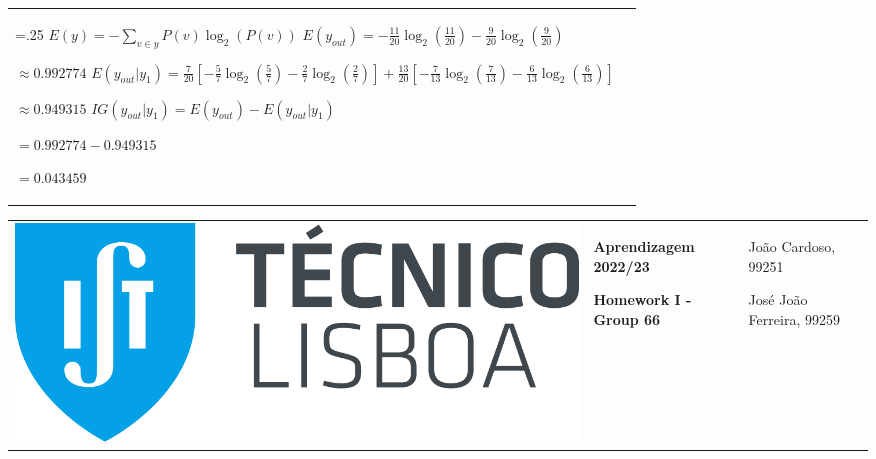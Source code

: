 \documentclass[11pt,a4paper]{article}
\begin{document}
\begin{flushleft}
\begin{tabularx}{1.09\textwidth}{>{\hsize=.25\hsize}X X}
  \normalsize\vspace{5mm}
  $ E(y) = -\sum_{v \in y} P(v)\log_2(P(v)) $
  \newline\newline
  $ E(y_{out}) = -\frac{11}{20}\log_2(\frac{11}{20}) -\frac{9}{20}\log_2(\frac{9}{20}) $ \par\vspace{1mm}
  \hspace{12.25mm} $ \approx 0.992774 $
  \newline\newline
  $ E(y_{out}|y_1) = \frac{7}{20}[-\frac{5}{7}\log_2(\frac{5}{7}) -\frac{2}{7}\log_2(\frac{2}{7})] + \frac{13}{20}[-\frac{7}{13}\log_2(\frac{7}{13}) -\frac{6}{13}\log_2(\frac{6}{13})] $ \par\vspace{1mm}
  \hspace{16.75mm} $ \approx 0.949315 $ 
  \newline\newline
  $ IG(y_{out}|y_1) = E(y_{out}) - E(y_{out}|y_1) $ \par\vspace{1mm}
  \hspace{18.75mm} $ = 0.992774 - 0.949315 $ \par\vspace{1mm}
  \hspace{18.75mm} $ = 0.043459 $
  
\end{tabularx}
\end{flushleft}

\pagebreak

\color{darkgray}
\hspace{-8.25mm}
\begin{tabularx}{1.09\textwidth} {>{\raggedright\arraybackslash}X >{\centering\arraybackslash}X >{\raggedleft\arraybackslash}X}
  \includegraphics[scale=0.2]{tecnico.pdf} &
  \textbf{Aprendizagem 2022/23} \par \textbf{Homework I - Group 66} &
  João Cardoso, 99251 \par José João Ferreira, 99259
\end{tabularx}
\color{black}
\end{document}
